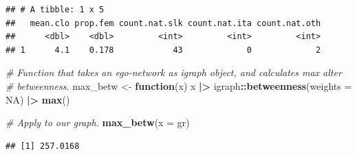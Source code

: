 \documentclass[
]{book}
\newenvironment{Shaded}{\begin{snugshade}}{\end{snugshade}}
\newcommand{\AttributeTok}[1]{\textcolor[rgb]{0.13,0.29,0.53}{#1}}
\newcommand{\CommentTok}[1]{\textcolor[rgb]{0.56,0.35,0.01}{\textit{#1}}}
\newcommand{\ConstantTok}[1]{\textcolor[rgb]{0.56,0.35,0.01}{#1}}
\newcommand{\ControlFlowTok}[1]{\textcolor[rgb]{0.13,0.29,0.53}{\textbf{#1}}}
\newcommand{\DecValTok}[1]{\textcolor[rgb]{0.00,0.00,0.81}{#1}}
\newcommand{\FunctionTok}[1]{\textcolor[rgb]{0.13,0.29,0.53}{\textbf{#1}}}
\newcommand{\NormalTok}[1]{#1}
\newcommand{\OtherTok}[1]{\textcolor[rgb]{0.56,0.35,0.01}{#1}}
\newcommand{\SpecialCharTok}[1]{\textcolor[rgb]{0.81,0.36,0.00}{\textbf{#1}}}
\begin{document}
\begin{verbatim}
## # A tibble: 1 x 5
##   mean.clo prop.fem count.nat.slk count.nat.ita count.nat.oth
##      <dbl>    <dbl>         <int>         <int>         <int>
## 1      4.1    0.178            43             0             2
\end{verbatim}

\begin{Shaded}
\begin{Highlighting}[]
\CommentTok{\# Function that takes an ego{-}network as igraph object, and calculates max alter}
\CommentTok{\# betweenness.}
\NormalTok{max\_betw }\OtherTok{\textless{}{-}} \ControlFlowTok{function}\NormalTok{(x) x }\SpecialCharTok{|\textgreater{}}\NormalTok{ igraph}\SpecialCharTok{::}\FunctionTok{betweenness}\NormalTok{(}\AttributeTok{weights =} \ConstantTok{NA}\NormalTok{) }\SpecialCharTok{|\textgreater{}} \FunctionTok{max}\NormalTok{()}

\CommentTok{\# Apply to our graph.}
\FunctionTok{max\_betw}\NormalTok{(}\AttributeTok{x =}\NormalTok{ gr)}
\end{Highlighting}
\end{Shaded}

\begin{verbatim}
## [1] 257.0168
\end{verbatim}

\begin{Shaded}
\end{Shaded}
\end{document}
